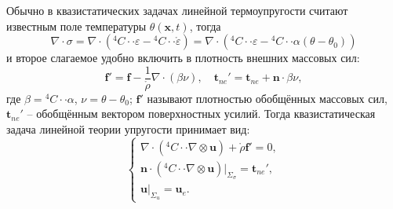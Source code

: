 Обычно в квазистатических задачах линейной термоупругости считают известным поле температуры
$\theta(\mathbf{x}, t)$, тогда
\[
  \nabla \cdot \sigma =
  \nabla \cdot ( {}^4 C \cdot\cdot \varepsilon - {}^4 C \cdot\cdot \mathring{\varepsilon} ) =
  \nabla \cdot ( {}^4 C \cdot\cdot \varepsilon - {}^4 C \cdot\cdot \alpha (\theta-\theta_0) )
\]
и второе слагаемое удобно включить в плотность внешних массовых сил:
\[
  \mathbf{f}' = \mathbf{f} - \dfrac{1}{\mathring{\rho}} \nabla \cdot (\beta \nu),
  \quad
  \mathbf{t}_{ne}' = \mathbf{t}_{ne} + \mathbf{n} \cdot \beta \nu,
\]
где $\beta = {}^4 C \cdot\cdot \alpha$, $\nu = \theta - \theta_0$; $\mathbf{f}'$ называют
плотностью обобщённых массовых сил, $\mathbf{t}_{ne}'$ -- обобщённым вектором поверхностных усилий.
Тогда квазистатическая задача линейной теории упругости принимает вид:
\[
  \begin{cases}
    \nabla \cdot \left( {}^4 C \cdot\cdot \nabla \otimes \mathbf{u} \right) + \mathring{\rho} \mathbf{f}' = 0, \\
    \mathbf{n} \cdot ({}^4 C \cdot\cdot \nabla \otimes \mathbf{u}) |_{\Sigma_\sigma} = \mathbf{t}_{ne}', \\
    \mathbf{u} |_{\Sigma_u} = \mathbf{u}_e.
  \end{cases}
  
\]


